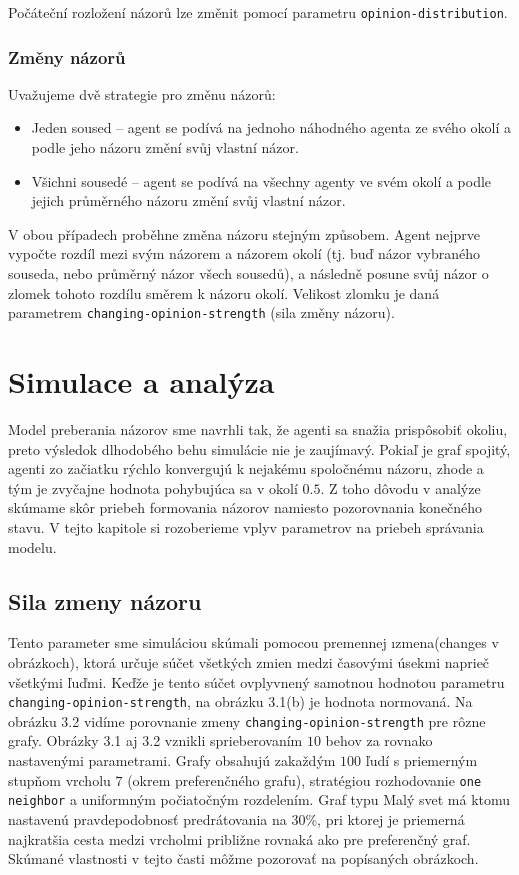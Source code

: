 \documentclass[10pt,a4paper]{report}
\begin{document}
Počáteční rozložení názorů lze změnit pomocí parametru \texttt{opinion-distribution}. 

\subsection{Změny názorů}
Uvažujeme dvě strategie pro změnu názorů:

\begin{itemize}
	\item Jeden soused -- agent se podívá na jednoho náhodného agenta ze svého okolí a podle jeho názoru změní svůj vlastní názor.
	\item Všichni sousedé -- agent se podívá na všechny agenty ve svém okolí a podle jejich průměrného názoru změní svůj vlastní názor.
\end{itemize}

V obou případech proběhne změna názoru stejným způsobem. Agent nejprve vypočte rozdíl mezi svým názorem a názorem okolí (tj. buď názor vybraného souseda, nebo průměrný názor všech sousedů), a následně posune svůj názor o zlomek tohoto rozdílu směrem k názoru okolí. Velikost zlomku je daná parametrem \texttt{changing-opinion-strength} (sila změny názoru).

\chapter{Simulace a analýza}
Model preberania názorov sme navrhli tak, že agenti sa snažia prispôsobiť okoliu, preto výsledok dlhodobého behu simulácie nie je zaujímavý. Pokiaľ je graf spojitý, agenti zo začiatku rýchlo konvergujú k nejakému spoločnému názoru, zhode a tým je zvyčajne hodnota pohybujúca sa v okolí $0.5$. Z toho dôvodu v analýze skúmame skôr priebeh formovania názorov namiesto pozorovnania konečného stavu. V tejto kapitole si rozoberieme vplyv parametrov na priebeh správania modelu.

\section{Sila zmeny názoru}

Tento parameter sme simuláciou skúmali pomocou premennej \i{zmena}(changes v obrázkoch), ktorá určuje súčet všetkých zmien medzi časovými úsekmi naprieč všetkými ľuďmi. Keďže je tento súčet ovplyvnený samotnou hodnotou parametru \texttt{changing-opinion-strength}, na obrázku 3.1(b) je hodnota normovaná. Na obrázku 3.2 vidíme porovnanie zmeny \texttt{changing-opinion-strength} pre rôzne grafy. Obrázky 3.1 aj 3.2 vznikli sprieberovaním $10$ behov za rovnako nastavenými parametrami. Grafy obsahujú zakaždým $100$ ľudí s priemerným stupňom vrcholu $7$ (okrem preferenčného grafu), stratégiou rozhodovanie \texttt{one neighbor} a uniformným počiatočným rozdelením. Graf typu Malý svet má ktomu nastavenú pravdepodobnosť predrátovania na 30\%, pri ktorej je priemerná najkratšia cesta medzi vrcholmi približne rovnaká ako pre preferenčný graf. Skúmané vlastnosti v tejto časti môžme pozorovať na popísaných obrázkoch.  
\end{document}
